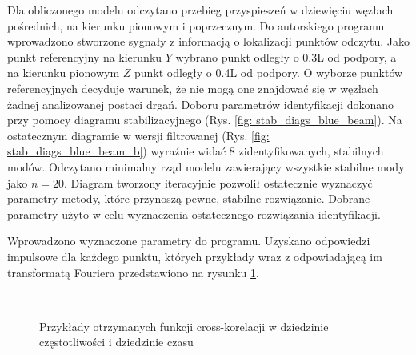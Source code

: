 Dla obliczonego modelu odczytano przebieg przyspieszeń w dziewięciu węzłach pośrednich, na kierunku pionowym i poprzecznym. Do autorskiego programu wprowadzono stworzone sygnały z informacją o lokalizacji punktów odczytu. Jako punkt referencyjny na kierunku $Y$ wybrano punkt odległy o 0.3L od podpory, a na kierunku pionowym $Z$ punkt odległy o 0.4L od podpory. O wyborze punktów referencyjnych decyduje warunek, że nie mogą one znajdować się w węzłach żadnej analizowanej postaci drgań. Doboru parametrów identyfikacji dokonano przy pomocy diagramu stabilizacyjnego (Rys. \ref{fig: stab_diags_blue_beam}). Na ostatecznym diagramie w wersji filtrowanej (Rys. \ref{fig: stab_diags_blue_beam_b}) wyraźnie widać 8 zidentyfikowanych, stabilnych modów. Odczytano minimalny rząd modelu zawierający wszystkie stabilne mody jako $n=20$. Diagram tworzony iteracyjnie pozwolił ostatecznie wyznaczyć parametry metody, które przynoszą pewne, stabilne rozwiązanie. Dobrane parametry użyto w celu wyznaczenia ostatecznego rozwiązania identyfikacji.



Wprowadzono wyznaczone parametry do programu. Uzyskano odpowiedzi impulsowe dla każdego punktu, których przykłady wraz z odpowiadającą im transformatą Fouriera przedstawiono na rysunku \ref{fig: cross_corr_blue_beam}. 

\begin{figure}[p]
	\centering
	\\
	\captionsetup{justification=centering}
	\caption{Przykłady otrzymanych funkcji cross-korelacji w dziedzinie częstotliwości i dziedzinie czasu}
	\label{fig: cross_corr_blue_beam}
\end{figure}

